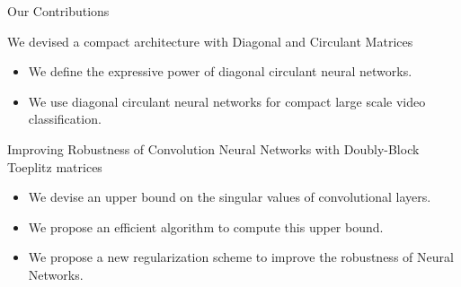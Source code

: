 %
%
%
%   


\begin{frame}{Our Contributions}

  \begin{block}{We devised a compact architecture with Diagonal and Circulant Matrices}
    \begin{itemize}[leftmargin=*]
      \item[] {\small We define the expressive power of diagonal circulant neural networks.}
      \item[] {\small We use diagonal circulant neural networks for compact large scale video classification.}
    \end{itemize}
  \end{block}

  \begin{block}{Improving Robustness of Convolution Neural Networks with Doubly-Block Toeplitz matrices}
    \begin{itemize}[leftmargin=*]
      \item[] {\small We devise an upper bound on the singular values of convolutional layers.}
      \item[] {\small We propose an efficient algorithm to compute this upper bound.}
      \item[] {\small We propose a new regularization scheme to improve the robustness of Neural Networks.}
    \end{itemize}
  \end{block}

\end{frame}



